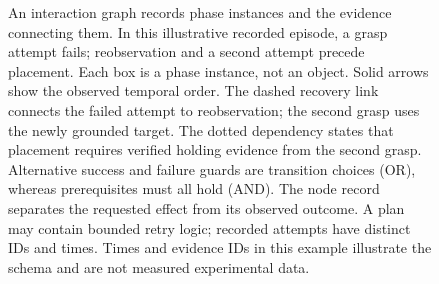 \begin{figure}[t]
{}
\caption{An interaction graph records phase instances and the evidence connecting them. In this illustrative recorded episode, a grasp attempt fails; reobservation and a second attempt precede placement. Each box is a phase instance, not an object. Solid arrows show the observed temporal order. The dashed recovery link connects the failed attempt to reobservation; the second grasp uses the newly grounded target. The dotted dependency states that placement requires verified holding evidence from the second grasp. Alternative success and failure guards are transition choices (OR), whereas prerequisites must all hold (AND). The node record separates the requested effect from its observed outcome. A plan may contain bounded retry logic; recorded attempts have distinct IDs and times. Times and evidence IDs in this example illustrate the schema and are not measured experimental data.}
\label{fig:semantics}
\end{figure}
